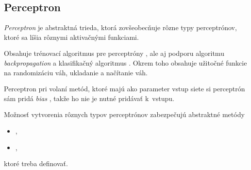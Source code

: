 \subsection{Perceptron}
\label{sect:perceptron}
\textit{Perceptron} je abstraktná trieda, ktorá zovšeobecňuje rôzne typy perceptrónov, ktoré sa líšia rôznymi aktivačnými funkciami.

Obsahuje trénovací algoritmus pre perceptróny
, ale aj podporu algoritmu \textit{backpropagation} 
a klasifikačný algoritmus 
. Okrem toho obsahuje užitočné funkcie na randomizáciu váh, ukladanie a načítanie váh.

Perceptron pri volaní metód, ktoré majú ako parameter vstup siete si perceptrón sám pridá \textit{bias}
, takže ho nie je nutné pridávať k~vstupu.

Možnosť vytvorenia rôznych typov perceptrónov zabezpečujú abstraktné metódy 
\begin{itemize}
\item {},
\item {},
\end{itemize}
ktoré treba definovať.

